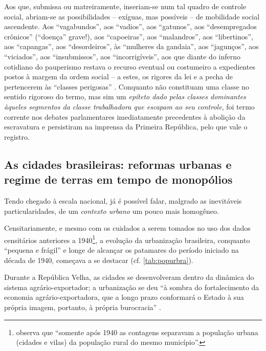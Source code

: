 Aos que, submissa ou matreiramente, inseriam-se num tal quadro de controle social, abriam-se as possibilidades -- exíguas, mas possíveis -- de mobilidade social ascendente. Aos ``vagabundos'', aos ``vadios'', aos ``gatunos'', aos ``desempregados crônicos'' (``doença'' grave!), aos ``capoeiras'', aos ``malandros'', aos ``libertinos'', aos ``capangas'', aos ``desordeiros'', às ``mulheres da gandaia'', aos ``jagunços'', aos ``viciados'', aos ``insubmissos'', aos ``incorrigíveis'', aos que diante do inferno cotidiano do pauperismo restava o recurso eventual ou costumeiro a expedientes postos à margem da ordem social  -- a estes, os rigores da lei e a pecha de pertencerem às ``classes perigosas'' \cite{chalhoub_botequim_1986, guimaraes_classper_1981}. Conquanto não constituam uma classe no sentido rigoroso do termo, mas sim um \textit{epíteto dado pelas classes dominantes àqueles segmentos da classe trabalhadora que escapam ao seu controle}, foi termo corrente nos debates parlamentares imediatamente precedentes à abolição da escravatura e persistiram na imprensa da Primeira República, pelo que vale o registro. 

\subsection{As cidades brasileiras: reformas urbanas e regime de terras em tempo de monopólios}\label{subsec:cidbraref}

Tendo chegado à escala nacional, já é possível falar, malgrado as inevitáveis particularidades, de um \textit{contexto urbano} um pouco mais homogêneo.

Censitariamente, e mesmo com os cuidados a serem tomados no uso dos dados censitários anteriores a 1940\footnote{ observa que ``somente após 1940 as contagens separavam a população urbana (cidades e vilas) da população rural do mesmo município''.}, a evolução da urbanização brasileira, conquanto ``pequena e frágil'' \cite[p.~303]{suzigan_polgov_2001} e longe de alcançar os patamares do período iniciado na década de 1940, começava a se destacar (cf. \autoref{tab:popurbra}).



Durante a República Velha, as cidades se desenvolveram dentro da dinâmica do sistema agrário-exportador; a urbanização se deu ``à sombra do fortalecimento da economia agrário-exportadora, que a longo prazo conformará o Estado à sua própria imagem, portanto, à própria burocracia''  \cite[p.~22-23]{pinheiro_clamed_1977}.

